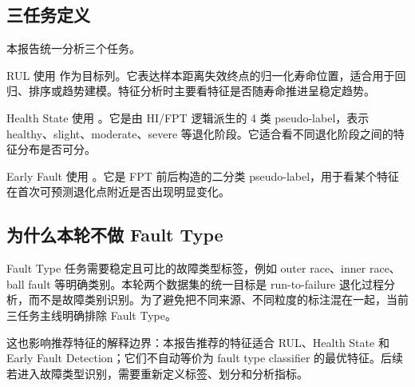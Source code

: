 

\subsection{三任务定义}

本报告统一分析三个任务。

\begin{description}[leftmargin=2.4em,style=nextline]
  \item[RUL]
  RUL 使用  作为目标列。它表达样本距离失效终点的归一化寿命位置，适合用于回归、排序或趋势建模。特征分析时主要看特征是否随寿命推进呈稳定趋势。

  \item[Health State]
  Health State 使用 。它是由 HI/FPT 逻辑派生的 4 类 pseudo-label，表示 healthy、slight、moderate、severe 等退化阶段。它适合看不同退化阶段之间的特征分布是否可分。

  \item[Early Fault Detection]
  Early Fault 使用 。它是 FPT 前后构造的二分类 pseudo-label，用于看某个特征在首次可预测退化点附近是否出现明显变化。
\end{description}

\subsection{为什么本轮不做 Fault Type}

Fault Type 任务需要稳定且可比的故障类型标签，例如 outer race、inner race、ball fault 等明确类别。本轮两个数据集的统一目标是 run-to-failure 退化过程分析，而不是故障类别识别。为了避免把不同来源、不同粒度的标注混在一起，当前三任务主线明确排除 Fault Type。

这也影响推荐特征的解释边界：本报告推荐的特征适合 RUL、Health State 和 Early Fault Detection；它们不自动等价为 fault type classifier 的最优特征。后续若进入故障类型识别，需要重新定义标签、划分和分析指标。


